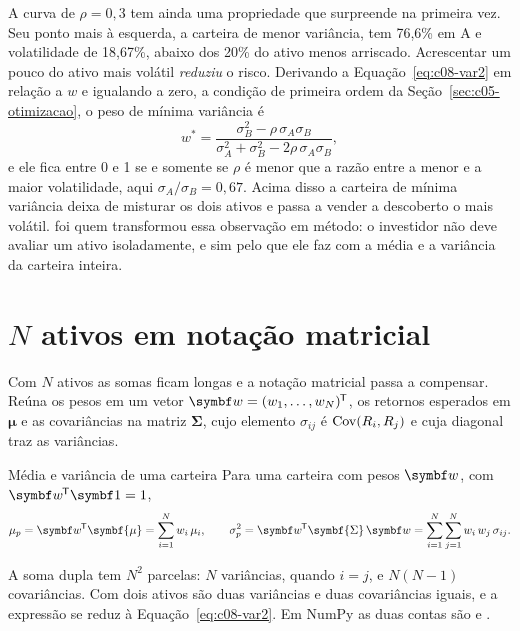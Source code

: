 A curva de $\rho = 0,3$ tem ainda uma propriedade que surpreende na primeira vez. Seu ponto mais à esquerda, a carteira de menor variância, tem 76,6\% em A e volatilidade de 18,67\%, abaixo dos 20\% do ativo menos arriscado. Acrescentar um pouco do ativo mais volátil \emph{reduziu} o risco. Derivando a Equação~\eqref{eq:c08-var2} em relação a $w$ e igualando a zero, a condição de primeira ordem da Seção~\ref{sec:c05-otimizacao}, o peso de mínima variância é
\begin{equation}
  w^{\ast} = \frac{\sigma_B^2 - \rho\,\sigma_A\sigma_B}{\sigma_A^2 + \sigma_B^2 - 2\rho\,\sigma_A\sigma_B} ,
  \label{eq:c08-wmin2}
\end{equation}
e ele fica entre 0 e 1 se e somente se $\rho$ é menor que a razão entre a menor e a maior volatilidade, aqui $\sigma_A/\sigma_B = 0,67$. Acima disso a carteira de mínima variância deixa de misturar os dois ativos e passa a vender a descoberto o mais volátil. \citet{markowitz1952} foi quem transformou essa observação em método: o investidor não deve avaliar um ativo isoladamente, e sim pelo que ele faz com a média e a variância da carteira inteira.

\section{$N$ ativos em notação matricial}
\label{sec:c08-matricial}

Com $N$ ativos as somas ficam longas e a notação matricial passa a compensar. Reúna os pesos em um vetor $\vetor{w} = (w_1, \dots, w_N)\T$, os retornos esperados em $\symbf{\mu}$ e as covariâncias na matriz $\symbf{\Sigma}$, cujo elemento $\sigma_{ij}$ é $\operatorname{Cov}(R_i, R_j)$ e cuja diagonal traz as variâncias.

\begin{resultado}{Média e variância de uma carteira}
Para uma carteira com pesos $\vetor{w}$, com $\vetor{w}\T\vetor{1} = 1$,
\begin{equation}
  \mu_p = \vetor{w}\T\symbf{\mu} = \sum_{i=1}^{N} w_i\,\mu_i ,
  \qquad
  \sigma_p^2 = \vetor{w}\T\symbf{\Sigma}\,\vetor{w} = \sum_{i=1}^{N}\sum_{j=1}^{N} w_i\,w_j\,\sigma_{ij} .
  \label{eq:c08-matricial}
\end{equation}
\end{resultado}

A soma dupla tem $N^2$ parcelas: $N$ variâncias, quando $i = j$, e $N(N-1)$ covariâncias. Com dois ativos são duas variâncias e duas covariâncias iguais, e a expressão se reduz à Equação~\eqref{eq:c08-var2}. Em NumPy as duas contas são  e .

